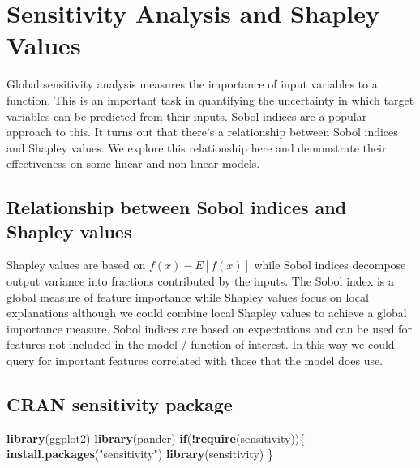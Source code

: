 \documentclass[
  11pt,
]{book}
\newenvironment{Shaded}{\begin{snugshade}}{\end{snugshade}}
\newcommand{\ControlFlowTok}[1]{\textcolor[rgb]{0.13,0.29,0.53}{\textbf{#1}}}
\newcommand{\KeywordTok}[1]{\textcolor[rgb]{0.13,0.29,0.53}{\textbf{#1}}}
\newcommand{\NormalTok}[1]{#1}
\newcommand{\OperatorTok}[1]{\textcolor[rgb]{0.81,0.36,0.00}{\textbf{#1}}}
\newcommand{\StringTok}[1]{\textcolor[rgb]{0.31,0.60,0.02}{#1}}
\begin{document}
\hypertarget{sensitivity-analysis-and-shapley-values}{%
\chapter{Sensitivity Analysis and Shapley Values}\label{sensitivity-analysis-and-shapley-values}}

Global sensitivity analysis measures the importance of input variables to a function. This is an important task in quantifying the uncertainty in which target variables can be predicted from their inputs. Sobol indices \citep{sobolindices} are a popular approach to this. It turns out that there's a relationship between Sobol indices and Shapley values. We explore this relationship here and demonstrate their effectiveness on some linear and non-linear models.

\hypertarget{relationship-between-sobol-indices-and-shapley-values}{%
\section{Relationship between Sobol indices and Shapley values}\label{relationship-between-sobol-indices-and-shapley-values}}

Shapley values are based on \(f(x)-E[f(x)]\) while Sobol indices decompose output variance into fractions contributed by the inputs. The Sobol index is a global measure of feature importance while Shapley values focus on local explanations although we could combine local Shapley values to achieve a global importance measure. Sobol indices are based on expectations and can be used for features not included in the model / function of interest. In this way we could query for important features correlated with those that the model does use.

\hypertarget{cran-sensitivity-package}{%
\section{CRAN sensitivity package}\label{cran-sensitivity-package}}

\begin{Shaded}
\begin{Highlighting}[]
\KeywordTok{library}\NormalTok{(ggplot2)}
\KeywordTok{library}\NormalTok{(pander)}
\ControlFlowTok{if}\NormalTok{(}\OperatorTok{!}\KeywordTok{require}\NormalTok{(sensitivity))\{}
    \KeywordTok{install.packages}\NormalTok{(}\StringTok{"sensitivity"}\NormalTok{)}
    \KeywordTok{library}\NormalTok{(sensitivity)}
\NormalTok{\}}
\end{Highlighting}
\end{Shaded}
\end{document}

